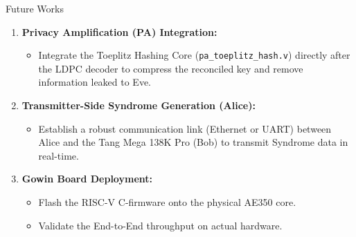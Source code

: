 \documentclass[t, aspectratio=169]{beamer}
\begin{document}
    \begin{frame}{Future Works}
		\begin{enumerate}
            \item \textbf{Privacy Amplification (PA) Integration:} 
            \begin{itemize}
                \item Integrate the Toeplitz Hashing Core (\texttt{pa\_toeplitz\_hash.v}) directly after the LDPC decoder to compress the reconciled key and remove information leaked to Eve.
            \end{itemize}
            
            \vspace{0.8em}
            \item \textbf{Transmitter-Side Syndrome Generation (Alice):} 
            \begin{itemize}
                \item Establish a robust communication link (Ethernet or UART) between Alice and the Tang Mega 138K Pro (Bob) to transmit Syndrome data in real-time.
            \end{itemize}
            
            \vspace{0.8em}
            \item \textbf{Gowin Board Deployment:} 
            \begin{itemize}
                \item Flash the RISC-V C-firmware onto the physical AE350 core.
                \item Validate the End-to-End throughput on actual hardware.
            \end{itemize}
        \end{enumerate}
	\end{frame}

	\hustthankyou
	
\end{document}
